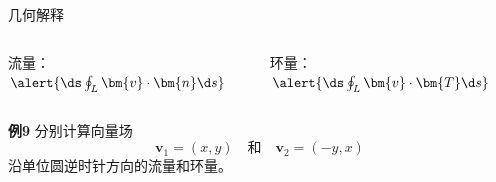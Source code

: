 \begin{frame}{几何解释}
\begin{columns}
\begin{center}
				{\bb 流量：}$\alert{\ds\oint_L\bm{v}\cdot\bm{n}\d s}$\pause 
			\end{center}
			\begin{center}
				\pause 
				
				{\bb 环量：}$\alert{\ds\oint_L\bm{v}\cdot\bm{T}\d s}$
			\end{center}
	\end{columns}
\end{frame}

\begin{frame}
	\linespread{1.2}
	\begin{exampleblock}{{\bf 例9}\hfill}
		分别计算向量场
		$$\bm{v}_1=(x,y)\quad\mbox{和}\quad \bm{v}_2=(-y,x)$$
		沿单位圆逆时针方向的流量和环量。
	\end{exampleblock}
\end{frame}

